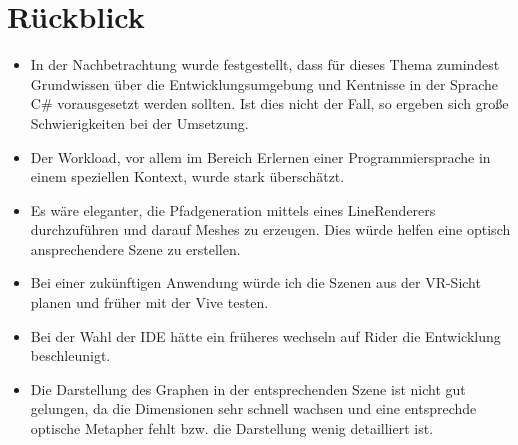\section{Rückblick}

\begin{itemize}
	\item In der Nachbetrachtung wurde festgestellt, dass für dieses Thema zumindest Grundwissen über die Entwicklungsumgebung und Kentnisse in der Sprache C\# vorausgesetzt werden sollten. Ist dies nicht der Fall, so ergeben sich große Schwierigkeiten bei der Umsetzung.
	\item Der Workload, vor allem im Bereich \glqq Erlernen einer Programmiersprache in einem speziellen Kontext\grqq{}, wurde stark überschätzt.   
	\item Es wäre eleganter, die Pfadgeneration mittels eines LineRenderers durchzuführen und darauf Meshes zu erzeugen. Dies würde helfen eine optisch ansprechendere Szene zu erstellen.
	\item Bei einer zukünftigen Anwendung würde ich die Szenen aus der VR-Sicht planen und früher mit der Vive testen.
	\item Bei der Wahl der IDE hätte ein früheres wechseln auf Rider die Entwicklung beschleunigt.
	\item Die Darstellung des Graphen in der entsprechenden Szene ist nicht gut gelungen, da die Dimensionen sehr schnell wachsen und eine entsprechde optische Metapher fehlt bzw. die Darstellung wenig detailliert ist. 
\end{itemize}

